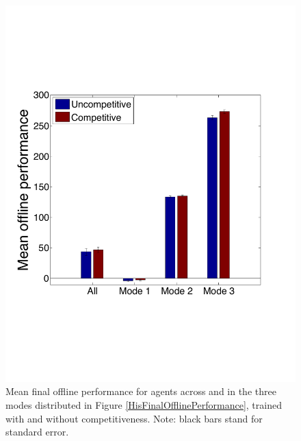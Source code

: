 \documentclass[10pt,journal,compsoc]{IEEEtran}
\begin{document}
\begin{figure}[htb]
\vspace{4mm}
\centering
\includegraphics[width=0.8\columnwidth, trim=0 0 0 0, clip]{CompetitionPerMode}%
\caption{Mean final offline performance for agents across and in the three modes distributed in Figure \ref{HisFinalOfflinePerformance}, trained with and without competitiveness. %
Note: black bars stand for standard error.}
\vspace{4mm}
\label{Mode}
\end{figure}
\end{document}
